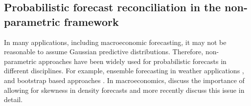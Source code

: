 \documentclass[graybox]{svmult}
\begin{document}
\subsection{Probabilistic forecast reconciliation in the non-parametric framework}\label{sec:probrecnp}

In many applications, including macroeconomic forecasting, it may not be reasonable to assume Gaussian predictive distributions. Therefore, non-parametric approaches have been widely used for probabilistic forecasts in different disciplines. For example, ensemble forecasting in weather applications \citep{GneRaf2005,Gneiting2014,Gneiting2008}, and bootstrap based approaches \citep{Manzan2008,Vilar2013}. In macroeconomics, \citet{CogEtAl2005} discuss the importance of allowing for skewness in density forecasts and more recently \citet{SmiVah2016} discuss this issue in detail.


\end{document}
